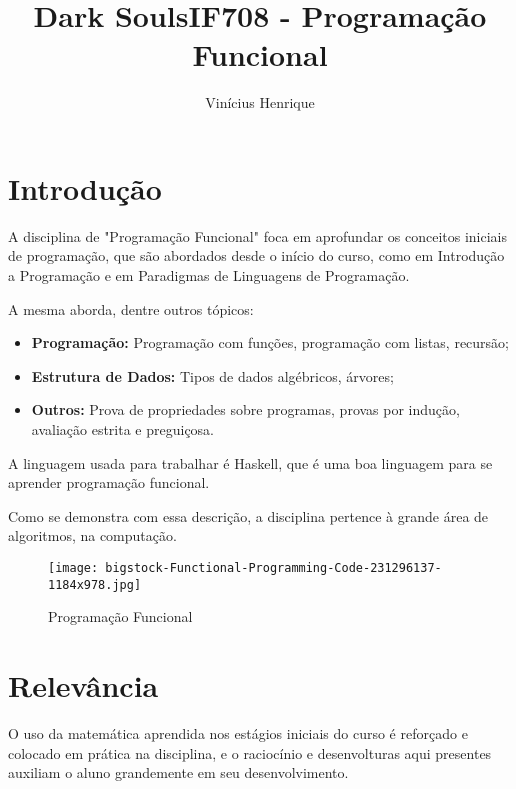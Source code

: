\documentclass[10pt]{article}
\title{Dark Souls}
\title{IF708 - Programação Funcional}
\author{Vinícius Henrique}
\begin{document}
\maketitle

\section{Introdução}
A disciplina de "Programação Funcional"\citep{r1} foca em aprofundar os conceitos iniciais de programação, que são abordados desde o início do curso, como em Introdução a Programação\citep{r2} e em Paradigmas de Linguagens de Programação\citep{r3}.

A mesma aborda, dentre outros tópicos\citep{r1}:
\begin{itemize}
    \item \textbf{Programação:} Programação com funções, programação com listas, recursão;
    \item \textbf{Estrutura de Dados:} Tipos de dados algébricos, árvores;
    \item \textbf{Outros:} Prova de propriedades sobre programas, provas por indução, avaliação estrita e preguiçosa.
\end{itemize}

A linguagem usada para trabalhar é Haskell\citep{r4}, que é uma boa linguagem para se aprender programação funcional.\citep{r5}

Como se demonstra com essa descrição, a disciplina pertence à grande área de algoritmos, na computação.

\begin{figure}[h!]
\texttt{[image: bigstock-Functional-Programming-Code-231296137-1184x978.jpg]}
\centering
\label{fig:i1}
\caption{Programação Funcional}
\end{figure}

\section{Relevância}
O uso da matemática aprendida nos estágios iniciais do curso é reforçado e colocado em prática na disciplina, e o raciocínio e desenvolturas aqui presentes auxiliam o aluno grandemente em seu desenvolvimento.
\end{document}
